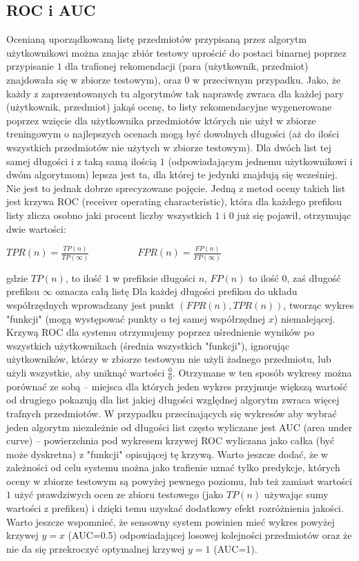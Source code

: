 \documentclass{pracamgr}
\begin{document}
   \subsection{ROC i AUC}
    Ocenianą uporządkowaną listę przedmiotów przypisaną przez algorytm użytkownikowi można znając zbiór testowy uprościć do postaci binarnej
    poprzez przypisanie $1$ dla trafionej rekomendacji (para (użytkownik, przedmiot) znajdowała się w zbiorze testowym), oraz $0$ w przeciwnym przypadku.
    Jako, że każdy z zaprezentowanych tu algorytmów tak naprawdę zwraca dla każdej pary (użytkownik, przedmiot) jakąś ocenę,
    to listy rekomendacyjne wygenerowane poprzez wzięcie dla użytkownika przedmiotów których nie użył w zbiorze treningowym o najlepszych ocenach
    mogą być dowolnych długości (aż do ilości wszystkich przedmiotów nie użytych w zbiorze testowym).
    Dla dwóch list tej samej długości i z taką samą ilością $1$ (odpowiadającym jednemu użytkownikowi i dwóm algorytmom) lepsza jest ta,
    dla której te jedynki znajdują się wcześniej. Nie jest to jednak dobrze sprecyzowane pojęcie.
    Jedną z metod oceny takich list jest krzywa ROC (receiver operating characteristic), która dla każdego prefiksu listy zlicza osobno
    jaki procent liczby wszystkich $1$ i $0$ już się pojawił, otrzymując dwie wartości:
    \begin{center}
     $TPR(n)=\frac{TP(n)}{TP(\infty)}\quad\quad\quad\quad\quad
     FPR(n)=\frac{FP(n)}{FP(\infty)}$
    \end{center}
    {\scriptsize
     gdzie $TP(n)$, to ilość $1$ w prefiksie długości $n$, $FP(n)$ to ilość $0$, zaś długość prefiksu $\infty$ oznacza całą listę
    }\newline
    Dla każdej długości prefiksu do układu współrzędnych wprowadzany jest punkt\newline
    $(FPR(n),TPR(n))$, tworząc wykres "funkcji"
    (mogą występować punkty o tej samej współrzędnej $x$) niemalejącej. Krzywą ROC dla systemu otrzymujemy poprzez uśrednienie wyników
    po wszystkich użytkownikach (średnia wszystkich "funkcji"), ignorując użytkowników, którzy w zbiorze testowym nie użyli żadnego przedmiotu,
    lub użyli wszystkie, aby uniknąć wartości $\frac{0}{0}$.
    Otrzymane w ten sposób wykresy można porównać ze sobą -- miejsca dla których jeden wykres przyjmuje większą wartość od drugiego pokazują
    dla list jakiej długości względnej algorytm zwraca więcej trafnych przedmiotów.
    W przypadku przecinających się wykresów aby wybrać jeden algorytm niezależnie od długości list często wyliczane jest AUC (area under curve) --
    powierzchnia pod wykresem krzywej ROC wyliczana jako całka (być może dyskretna) z "funkcji" opisującej tę krzywą.
    Warto jeszcze dodać, że w zależności od celu systemu można jako trafienie uznać tylko predykcje, których oceny w zbiorze testowym są powyżej pewnego poziomu,
    lub też zamiast wartości $1$ użyć prawdziwych ocen ze zbioru testowego (jako $TP(n)$ używając sumy wartości z prefiksu)
    i dzięki temu uzyskać dodatkowy efekt rozróżnienia jakości.
    Warto jeszcze wspomnieć, że sensowny system powinien mieć wykres powyżej krzywej $y=x$ (AUC=0.5) odpowiadającej losowej kolejności przedmiotów
    oraz że nie da się przekroczyć optymalnej krzywej $y=1$ (AUC=1).
\end{document}
